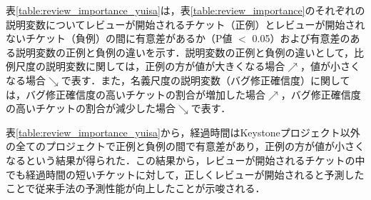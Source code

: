\documentclass[submit]{ipsj}
\begin{document}
\begin{table}[t]
\caption{レビューが開始されるチケットの予測において重要度の高い説明変数と重要度}
\label{table:review_importance}
\centering
\vspace{0.5zh}
\end{table}

表\ref{table:review_importance_yuisa}は，表\ref{table:review_importance}のそれぞれの説明変数についてレビューが開始されるチケット（正例）とレビューが開始されないチケット（負例）の間に有意差があるか（P値 $<$ 0.05）および有意差のある説明変数の正例と負例の違いを示す．説明変数の正例と負例の違いとして，比例尺度の説明変数に関しては，正例の方が値が大きくなる場合$\nearrow$，値が小さくなる場合$\searrow$で表す．また，名義尺度の説明変数（バグ修正確信度）に関しては，バグ修正確信度の高いチケットの割合が増加した場合$\nearrow$，バグ修正確信度の高いチケットの割合が減少した場合$\searrow$で表す．

表\ref{table:review_importance_yuisa}から，経過時間はKeystoneプロジェクト以外の全てのプロジェクトで正例と負例の間で有意差があり，正例の方が値が小さくなるという結果が得られた．この結果から，レビューが開始されるチケットの中でも経過時間の短いチケットに対して，正しくレビューが開始されると予測したことで従来手法の予測性能が向上したことが示唆される．
\end{document}
